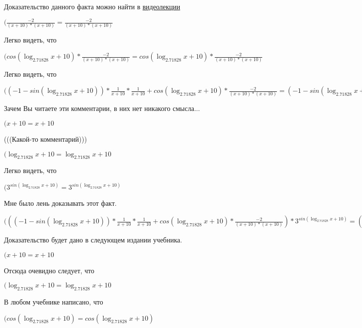 \documentclass[12pt,a4paper,fleqn]{article}
\theoremstyle{definition}
\begin{document}
Доказательство данного факта можно найти в \href{https://www.youtube.com/watch?v=dQw4w9WgXcQ}{видеолекции}

$(\frac{ -2 }{( x  +  10 ) * ( x  +  10 )}
 = \frac{ -2 }{( x  +  10 ) * ( x  +  10 )}
$

Легко видеть, что

$(cos(\log_{ 2.71828 }{ x  +  10 }) * \frac{ -2 }{( x  +  10 ) * ( x  +  10 )}
 = cos(\log_{ 2.71828 }{ x  +  10 }) * \frac{ -2 }{( x  +  10 ) * ( x  +  10 )}
$

Легко видеть, что

$(( -1  - sin(\log_{ 2.71828 }{ x  +  10 })) * \frac{ 1 }{ x  +  10 }
 * \frac{ 1 }{ x  +  10 }
 + cos(\log_{ 2.71828 }{ x  +  10 }) * \frac{ -2 }{( x  +  10 ) * ( x  +  10 )}
 = ( -1  - sin(\log_{ 2.71828 }{ x  +  10 })) * \frac{ 1 }{ x  +  10 }
 * \frac{ 1 }{ x  +  10 }
 + cos(\log_{ 2.71828 }{ x  +  10 }) * \frac{ -2 }{( x  +  10 ) * ( x  +  10 )}
$

Зачем Вы читаете эти комментарии, в них нет никакого смысла...

$( x  +  10  =  x  +  10 $

(((Какой-то комментарий)))

$(\log_{ 2.71828 }{ x  +  10 } = \log_{ 2.71828 }{ x  +  10 }$

Легко видеть, что

$({ 3 }^{sin(\log_{ 2.71828 }{ x  +  10 })} = { 3 }^{sin(\log_{ 2.71828 }{ x  +  10 })}$

Мне было лень доказывать этот факт.

$((( -1  - sin(\log_{ 2.71828 }{ x  +  10 })) * \frac{ 1 }{ x  +  10 }
 * \frac{ 1 }{ x  +  10 }
 + cos(\log_{ 2.71828 }{ x  +  10 }) * \frac{ -2 }{( x  +  10 ) * ( x  +  10 )}
) * { 3 }^{sin(\log_{ 2.71828 }{ x  +  10 })} = (( -1  - sin(\log_{ 2.71828 }{ x  +  10 })) * \frac{ 1 }{ x  +  10 }
 * \frac{ 1 }{ x  +  10 }
 + cos(\log_{ 2.71828 }{ x  +  10 }) * \frac{ -2 }{( x  +  10 ) * ( x  +  10 )}
) * { 3 }^{sin(\log_{ 2.71828 }{ x  +  10 })}$

Доказательство будет дано в следующем издании учебника.

$( x  +  10  =  x  +  10 $

Отсюда очевидно следует, что

$(\log_{ 2.71828 }{ x  +  10 } = \log_{ 2.71828 }{ x  +  10 }$

В любом учебнике написано, что

$(cos(\log_{ 2.71828 }{ x  +  10 }) = cos(\log_{ 2.71828 }{ x  +  10 })$
\end{document}
